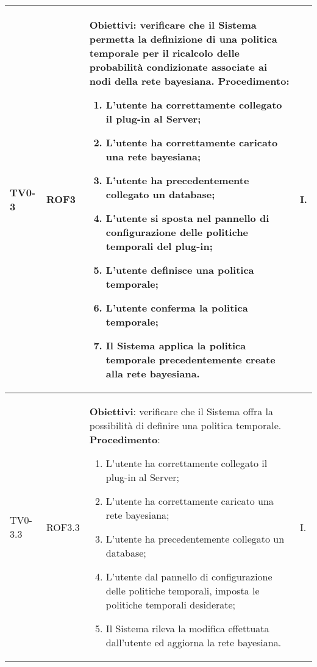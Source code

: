 \begin{longtable}{|C{.15\textwidth}|C{.13\textwidth}|m{.52\textwidth}|C{.08\textwidth}|}
TV0-3 & ROF3 &
	\textbf{Obiettivi}: verificare che il Sistema permetta la definizione di una politica temporale per il ricalcolo delle probabilità condizionate associate ai nodi della rete bayesiana. \newline
	\textbf{Procedimento}:
	\begin{enumerate}
		\item L'utente ha correttamente collegato il plug-in al Server;
		\item L'utente ha correttamente caricato una rete bayesiana;
		\item L'utente ha precedentemente collegato un database;
		\item L'utente si sposta nel pannello di configurazione delle politiche temporali del plug-in;
		\item L'utente definisce una politica temporale;
		\item L'utente conferma la politica temporale;
		\item Il Sistema applica la politica temporale precedentemente create alla rete bayesiana.
	\end{enumerate}
	& I. \\
\hline

TV0-3.3 & ROF3.3 &
	\textbf{Obiettivi}: verificare che il Sistema offra la possibilità di definire una politica temporale. \newline
	\textbf{Procedimento}:
	\begin{enumerate}
		\item L'utente ha correttamente collegato il plug-in al Server;
		\item L'utente ha correttamente caricato una rete bayesiana;
		\item L'utente ha precedentemente collegato un database;
		\item L'utente dal pannello di configurazione delle politiche temporali, imposta le politiche temporali desiderate;
		\item Il Sistema rileva la modifica effettuata dall'utente ed aggiorna la rete bayesiana.
	\end{enumerate}
	& I. \\
\hline


\end{longtable}
